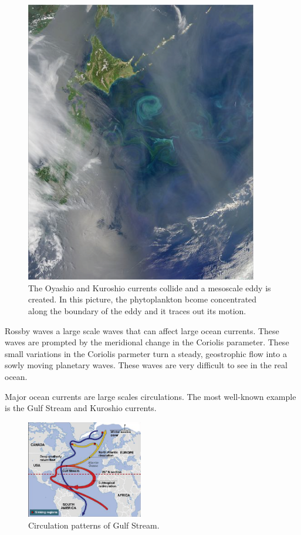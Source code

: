 \begin{center}
\begin{figure}[h!]
\centering
  \includegraphics[width=4in]{Images/eddies}
  \caption[Mesoscale Eddies]{The Oyashio and Kuroshio currents collide and a mesoscale eddy is created.  In this picture, the phytoplankton bcome concentrated along the boundary of the eddy and it traces out its motion.  \cite{Wiki}}\label{f:eddies}
\end{figure}
\end{center}

Rossby waves a large scale waves that can affect large ocean currents.  These waves are prompted by the meridional change in the Coriolis parameter.  These small variations in the Coriolis parmeter turn a steady, geostrophic flow into a sowly moving planetary waves.  These waves are very difficult to see in the real ocean.  

Major ocean currents are large scales circulations.  The most well-known example is the Gulf Stream and Kuroshio currents.

\begin{center}
\begin{figure}[h!]
\centering
  \includegraphics[width=2in]{Images/GulfStream}
  \caption[Gulf Stream]{Circulation patterns of Gulf Stream. \cite{Wiki}}\label{f:GulfStream}
\end{figure}
\end{center}

